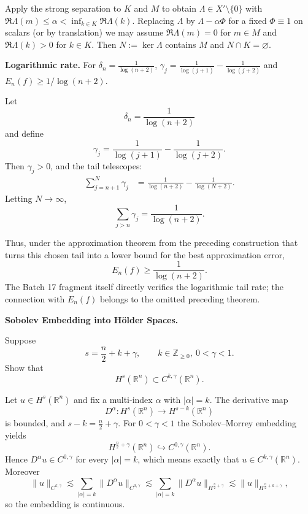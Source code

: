 \begin{solution}
Apply the strong separation to $K$ and $M$ to obtain $\Lambda\in X'\setminus\{0\}$ with
	$\Re\Lambda(m)\le \alpha < \inf_{k\in K}\Re\Lambda(k)$. Replacing $\Lambda$ by $\Lambda-\alpha\Phi$
	for a fixed $\Phi\equiv 1$ on scalars (or by translation) we may assume $\Re\Lambda(m)=0$ for $m\in M$
	and $\Re\Lambda(k)>0$ for $k\in K$. Then $N:=\ker\Lambda$ contains $M$ and $N\cap K=\varnothing$.

	\bigskip
\end{solution}

\begin{problem}[CP-II-0482]
\label{prob:cp-ii-0482}
\textbf{Logarithmic rate.}
	For $\delta_n=\frac{1}{\log(n+2)}$,
	$\gamma_j=\frac{1}{\log(j+1)}-\frac{1}{\log(j+2)}$ and
	$E_n(f)\ge 1/\log(n+2)$.
\end{problem}

\begin{solution}
Let
\[
\delta_n=\frac1{\log(n+2)}
\]
and define
\[
\gamma_j
=
\frac1{\log(j+1)}
-
\frac1{\log(j+2)}.
\]
Then \(\gamma_j>0\), and the tail telescopes:
\[
\begin{aligned}
\sum_{j=n+1}^{N}\gamma_j
&=
\frac1{\log(n+2)}
-
\frac1{\log(N+2)}.
\end{aligned}
\]
Letting \(N\to\infty\),
\[
\boxed{
\sum_{j>n}\gamma_j
=
\frac1{\log(n+2)}.
}
\]

Thus, under the approximation theorem from the preceding construction that turns this chosen
tail into a lower bound for the best approximation error,
\[
\boxed{
E_n(f)
\ge
\frac1{\log(n+2)}.
}
\]
The Batch 17 fragment itself directly verifies the logarithmic tail rate; the connection with
\(E_n(f)\) belongs to the omitted preceding theorem.
\end{solution}


\begin{problem}[CP-II-0483]
\label{prob:cp-ii-0483}
\textbf{Sobolev Embedding into Hölder Spaces.}

\hspace*{1.5em}Suppose
\[
s = \frac n2 + k + \gamma, \qquad k\in\mathbb Z_{\ge 0},\ 0<\gamma<1.
\]
Show that
\[
H^s(\mathbb R^n) \subset C^{k,\gamma}(\mathbb R^n).
\]
\end{problem}

\begin{solution}
Let $u\in H^s(\mathbb R^n)$ and fix a multi-index $\alpha$ with $|\alpha|=k$.
The derivative map
\[
D^\alpha : H^s(\mathbb R^n)\longrightarrow H^{s-k}(\mathbb R^n)
\]
is bounded, and $s-k=\frac n2+\gamma$.
For $0<\gamma<1$ the Sobolev--Morrey embedding yields
\[
H^{\frac n2+\gamma}(\mathbb R^n)\hookrightarrow C^{0,\gamma}(\mathbb R^n).
\]
Hence $D^\alpha u\in C^{0,\gamma}$ for every $|\alpha|=k$, which means exactly that
$u\in C^{k,\gamma}(\mathbb R^n)$. Moreover
\[
\|u\|_{C^{k,\gamma}}
\lesssim \sum_{|\alpha|=k} \|D^\alpha u\|_{C^{0,\gamma}}
\lesssim \sum_{|\alpha|=k} \|D^\alpha u\|_{H^{\frac n2+\gamma}}
\lesssim \|u\|_{H^{\frac n2+k+\gamma}},
\]
so the embedding is continuous.

\bigskip
\bigskip
\end{solution}

